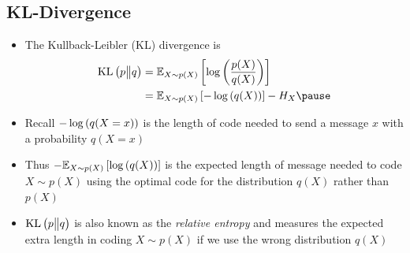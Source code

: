 \Outline %

\begin{slide}
\section[-2]{KL-Divergence}

\begin{PauseHighLight}
  \begin{itemize}
  \item The Kullback-Leibler (KL) divergence is
    \begin{align*}
      \KL{p}{q} &= \av[X\sim p(X)]{\logg{\frac{p(X)}{q(X)}}} \\
      &= \av[X\sim p(X)]{-\logg{q(X)}} - H_X\pause
    \end{align*}
  \item Recall $-\logg{q(X=x)}$ is the length of code needed to send a
    message $x$ with a probability $q(X=x)$\pause
  \item  Thus $-\av[X\sim p(X)]{\logg{q(X)}}$ is the expected length of
    message needed to code $X\sim p(X)$ using the optimal code for the
    distribution $q(X)$ rather than $p(X)$\pause
  \item $\KL{p}{q}$ is also known as the \emph{relative entropy}
    and measures the expected extra length in coding $X\sim p(X)$ if
    we use the wrong distribution $q(X)$\pause
  \end{itemize}
\end{PauseHighLight}

\end{slide}


